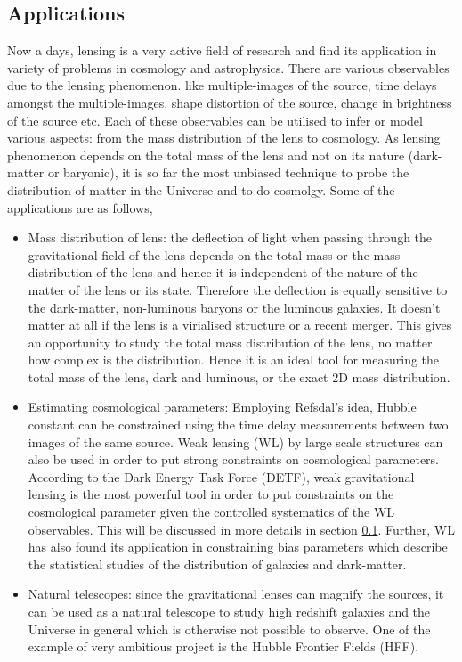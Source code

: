 \subsection{Applications}

Now a days, lensing is a very active field of research and find its application
in variety of problems in cosmology and astrophysics. 
There are various observables due to the lensing phenomenon. like multiple-images of the source, time 
delays amongst the multiple-images, shape distortion of the source, change in brightness
of the source etc. Each of these observables can be utilised to infer or model various
aspects: from the mass distribution of the lens to cosmology. As lensing phenomenon depends 
on the total mass of the lens and not on its nature (dark-matter or baryonic), it is
so far the most unbiased technique to probe the distribution of matter in the Universe
and to do cosmolgy.
Some of the applications are as follows,
\begin{itemize}
	\item Mass distribution of lens: the deflection of light when passing through
			the gravitational field of the lens depends on the total mass or the
			mass distribution of the lens and hence it is independent of the nature
			of the matter of the lens or its state. Therefore the
			deflection is equally sensitive to the dark-matter, non-luminous baryons
			or the luminous galaxies. It doesn't matter at all if the lens is a 
			virialised structure or a recent merger. This gives an opportunity to 
			study the total mass distribution of the lens, no matter how complex is 
			the distribution. Hence it is an ideal tool for measuring the total mass
			of the lens, dark and luminous, or the exact 2D mass distribution. 

	\item Estimating cosmological parameters: Employing Refsdal's idea, Hubble constant
			can be constrained using the time delay measurements between two images
			of the same source. Weak lensing (WL) by large scale structures 
			can also be used in order to put
			strong constraints on cosmological parameters. According to the Dark 
			Energy Task Force (DETF), weak gravitational lensing is the most powerful
			tool in order to put constraints on the cosmological parameter given
			the controlled systematics of the WL observables. This will be discussed
			in more details in section \ref{}. Further, WL has also found its application
			in constraining bias parameters which describe the statistical studies
			of the distribution of galaxies and dark-matter. 

	\item Natural telescopes: since the gravitational lenses can magnify the sources, it 
			can be used as a natural telescope to study high redshift galaxies and the Universe
			in general which is otherwise not possible to observe. One of the example of 
			very ambitious project is the Hubble Frontier Fields (HFF). 
\end{itemize}


